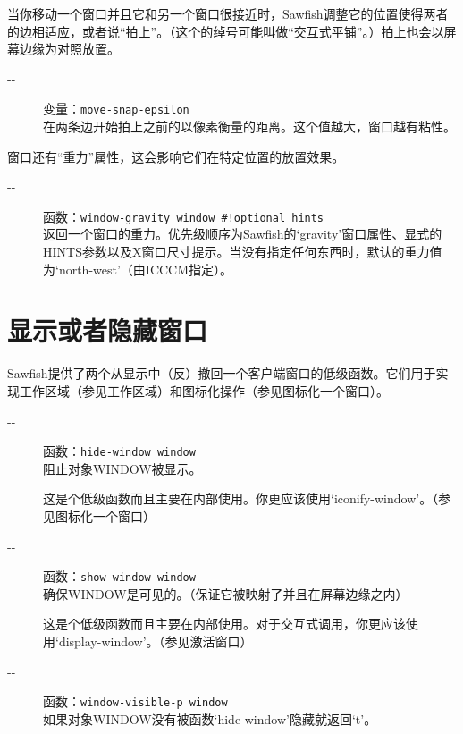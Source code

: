 \documentclass{book}
\begin{document}
\begin{CJK*}{UTF8}{gbsn}
当你移动一个窗口并且它和另一个窗口很接近时，Sawfish调整它的位置使得两者的边相适应，或者说``拍上''。（这个的绰号可能叫做``交互式平铺''。）拍上也会以屏幕边缘为对照放置。
\begin{description}
\item[-{}-] 变量：\verb|move-snap-epsilon|\\
在两条边开始拍上之前的以像素衡量的距离。这个值越大，窗口越有粘性。
\end{description}

窗口还有``重力''属性，这会影响它们在特定位置的放置效果。
\begin{description}
\item[-{}-] 函数：\verb|window-gravity window #!optional hints|\\
返回一个窗口的重力。优先级顺序为Sawfish的`gravity'窗口属性、显式的HINTS参数以及X窗口尺寸提示。当没有指定任何东西时，默认的重力值为`north-west'（由ICCCM指定）。
\end{description}
\section{显示或者隐藏窗口}
Sawfish提供了两个从显示中（反）撤回一个客户端窗口的低级函数。它们用于实现工作区域（参见工作区域）和图标化操作（参见图标化一个窗口）。
\begin{description}
\item[-{}-] 函数：\verb|hide-window window|\\
阻止对象WINDOW被显示。

这是个低级函数而且主要在内部使用。你更应该使用`iconify-window'。（参见图标化一个窗口）
\item[-{}-] 函数：\verb|show-window window|\\
确保WINDOW是可见的。（保证它被映射了并且在屏幕边缘之内）

这是个低级函数而且主要在内部使用。对于交互式调用，你更应该使用`display-window'。（参见激活窗口）
\item[-{}-] 函数：\verb|window-visible-p window|\\
如果对象WINDOW没有被函数`hide-window'隐藏就返回`t'。
\end{description}

\end{CJK*}
\end{document}
